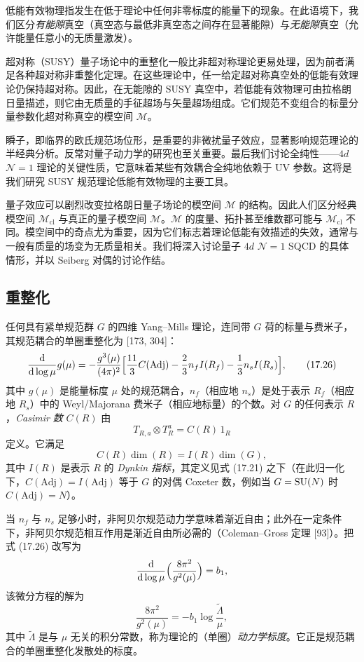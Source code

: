 低能有效物理指发生在低于理论中任何非零标度的能量下的现象。在此语境下，我们区分\emph{有能隙}真空（真空态与最低非真空态之间存在显著能隙）与\emph{无能隙}真空（允许能量任意小的无质量激发）。

超对称（SUSY）量子场论中的重整化一般比非超对称理论更易处理，因为前者满足各种超对称非重整化定理。在这些理论中，任一给定超对称真空处的低能有效理论仍保持超对称。因此，在无能隙的 SUSY 真空中，若低能有效物理可由拉格朗日量描述，则它由无质量的手征超场与矢量超场组成。它们规范不变组合的标量分量参数化超对称真空的模空间 $\mathcal{M}$。

瞬子，即临界的欧氏规范场位形，是重要的非微扰量子效应，显著影响规范理论的半经典分析。反常对量子动力学的研究也至关重要。最后我们讨论全纯性——$4d$ $\mathcal{N}=1$ 理论的关键性质，它意味着某些有效耦合全纯地依赖于 UV 参数。这将是我们研究 SUSY 规范理论低能有效物理的主要工具。

量子效应可以剧烈改变拉格朗日量子场论的模空间 $\mathcal{M}$ 的结构。因此人们区分经典模空间 $\mathcal{M}_{\mathrm{cl}}$ 与真正的量子模空间 $\mathcal{M}$。$\mathcal{M}$ 的度量、拓扑甚至维数都可能与 $\mathcal{M}_{\mathrm{cl}}$ 不同。模空间中的奇点尤为重要，因为它们标志着理论低能有效描述的失效，通常与一般有质量的场变为无质量相关。我们将深入讨论量子 $4d$ $\mathcal{N}=1$ SQCD 的具体情形，并以 Seiberg 对偶的讨论作结。

\subsection{重整化}

任何具有紧单规范群 $G$ 的四维 Yang--Mills 理论，连同带 $G$ 荷的标量与费米子，其规范耦合的单圈重整化为 [173, 304]：
\begin{equation}
\frac{\mathrm{d}}{\mathrm{d}\log\mu}g(\mu)=-\frac{g^3(\mu)}{(4\pi)^2}\Bigl[\frac{11}{3}C(\mathrm{Adj})-\frac{2}{3}n_f I(R_f)-\frac{1}{3}n_s I(R_s)\Bigr],
\tag{17.26}
\end{equation}
其中 $g(\mu)$ 是能量标度 $\mu$ 处的规范耦合，$n_f$（相应地 $n_s$）是处于表示 $R_f$（相应地 $R_s$）中的 Weyl/Majorana 费米子（相应地标量）的个数。对 $G$ 的任何表示 $R$，\emph{Casimir 数} $C(R)$ 由
\[
T_{R,a}\otimes T_R^a=C(R)\,1_R
\]
定义。它满足
\[
C(R)\dim(R)=I(R)\dim(G),
\]
其中 $I(R)$ 是表示 $R$ 的 \emph{Dynkin 指标}，其定义见式 (17.21) 之下（在此归一化下，$C(\mathrm{Adj})=I(\mathrm{Adj})$ 等于 $G$ 的对偶 Coxeter 数，例如当 $G=\operatorname{SU}(N)$ 时 $C(\mathrm{Adj})=N$）。

当 $n_f$ 与 $n_s$ 足够小时，非阿贝尔规范动力学意味着渐近自由；此外在一定条件下，非阿贝尔规范相互作用是渐近自由所必需的（Coleman--Gross 定理 [93]）。把式 (17.26) 改写为
\[
\frac{\mathrm{d}}{\mathrm{d}\log\mu}\Bigl(\frac{8\pi^2}{g^2(\mu)}\Bigr)=b_1,
\]
该微分方程的解为
\[
\frac{8\pi^2}{g^2(\mu)}=-b_1\log\frac{\tilde\Lambda}{\mu},
\]
其中 $\tilde\Lambda$ 是与 $\mu$ 无关的积分常数，称为理论的（单圈）\emph{动力学标度}。它正是规范耦合的单圈重整化发散处的标度。

